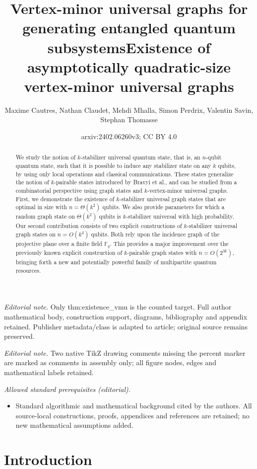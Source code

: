 \documentclass[10pt,a4paper]{article}
\title{Vertex-minor universal graphs for  generating  entangled quantum subsystems}
\title{Existence of asymptotically quadratic-size vertex-minor universal graphs}
\author{Maxime Cautres, Nathan Claudet, Mehdi Mhalla, Simon Perdrix, Valentin Savin, Stephan Thomasse}
\date{arxiv:2402.06260v3; CC BY 4.0}
\begin{document}
\maketitle
\noindent\textit{Editorial note.} Only thm:existence\_vmu is the counted target. Full author mathematical body, construction support, diagrams, bibliography and appendix retained. Publisher metadata/class is adapted to article; original source remains preserved.\par\medskip
\noindent\textit{Editorial note.} Two native TikZ drawing comments missing the percent marker are marked as comments in assembly only; all figure nodes, edges and mathematical labels retained.\par\medskip
\noindent\textit{Allowed standard prerequisites (editorial).}\begin{itemize}
\item Standard algorithmic and mathematical background cited by the authors. All source-local constructions, proofs, appendices and references are retained; no new mathematical assumptions added.
\end{itemize}\medskip
\begin{abstract}
We study the notion of  $k$-stabilizer universal quantum state, that is, an $n$-qubit quantum state, such that it is possible to induce any stabilizer state on any $k$ qubits, by using only local operations and classical communications. These states generalize the notion of $k$-pairable states introduced by Bravyi et al., and can be studied from a combinatorial perspective using graph states and $k$-vertex-minor universal graphs. First, we demonstrate the existence of $k$-stabilizer universal graph states that are optimal in size with $n=\Theta(k^2)$ qubits. We also provide parameters for which a random graph state on $\Theta(k^2)$ qubits is $k$-stabilizer universal with high probability. Our second  contribution consists of two explicit constructions of $k$-stabilizer universal graph states on $n = O(k^4)$ qubits. Both  rely upon the incidence graph of the projective plane over a finite field $\mathbb{F}_q$. This provides a major improvement over the previously known explicit construction of $k$-pairable graph states with $n = O(2^{3k})$, 
bringing forth a new and potentially powerful family of multipartite quantum resources.
\end{abstract}

\section{Introduction}
\end{document}
